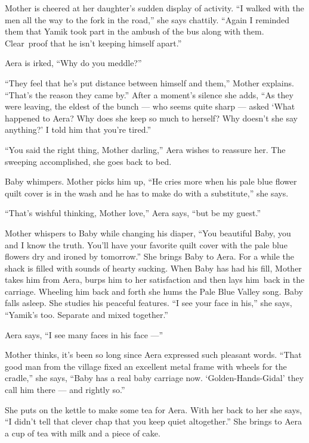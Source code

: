 \documentclass[twoside,11pt,openany]{book}
\begin{document}
Mother is cheered at her daughter's sudden display of activity. ``I walked with the men all the way to the
fork in the road,'' she says chattily. ``Again I reminded them that Yamik took part in the
ambush of the bus along with them.  Clear~proof that he isn't keeping himself apart.''

Aera is irked, ``Why do you meddle?''

``They feel that he's put distance between himself and them,'' Mother explains.
``That's the reason they came by.'' After a moment's silence she adds, ``As they
were leaving, the eldest of the bunch --- who seems quite sharp --- asked `What happened to Aera? Why does she keep so much
to herself? Why doesn't she say anything?' I told him that you're tired.''

``You said the right thing, Mother darling,'' Aera wishes to reassure her. The sweeping
accomplished, she goes back to bed.

Baby whimpers. Mother picks him up, ``He cries more when his pale blue flower quilt cover is in the wash
and he has to make do with a substitute,'' she says.

``That's wishful thinking, Mother love,'' Aera says, ``but be my
guest.''

Mother whispers to Baby while changing his diaper, ``You beautiful Baby, you and I know the truth. You'll
have your favorite quilt cover with the pale blue flowers dry and ironed by tomorrow.'' She brings Baby
to Aera. For a while the shack is filled with sounds of hearty sucking. When Baby has had his fill, Mother takes him
from Aera, burps him to her satisfaction and then lays him~back in the carriage. Wheeling him back and forth she hums
the Pale Blue Valley song. Baby falls asleep. She studies his peaceful features. ``I see your face in
his,{}'' she says, ``Yamik's too. Separate and mixed together.''

Aera says, ``I see many faces in his face ---''

Mother thinks, it's been so long since Aera expressed such pleasant words. ``That good
man from the village fixed an excellent metal frame with wheels for the cradle,'' she says,
``Baby has a real baby carriage now. `Golden-Hands-Gidal' they call him there --- and rightly
so.''

She puts on the kettle to make some tea for Aera. With her back to her she says, ``I didn't tell that
clever chap that you keep quiet altogether.'' She brings  to Aera a cup of tea with milk and a piece of
cake.
\end{document}

